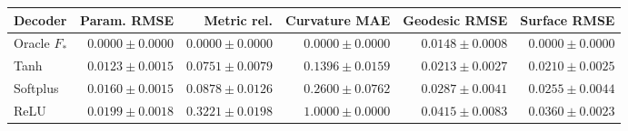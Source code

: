 \begin{tabular}{lrrrrr}
\toprule
Decoder & Param. RMSE & Metric rel. & Curvature MAE & Geodesic RMSE & Surface RMSE \\
\midrule
Oracle $F_*$ & $0.0000\pm0.0000$ & $0.0000\pm0.0000$ & $0.0000\pm0.0000$ & $0.0148\pm0.0008$ & $0.0000\pm0.0000$ \\
Tanh & $0.0123\pm0.0015$ & $0.0751\pm0.0079$ & $0.1396\pm0.0159$ & $0.0213\pm0.0027$ & $0.0210\pm0.0025$ \\
Softplus & $0.0160\pm0.0015$ & $0.0878\pm0.0126$ & $0.2600\pm0.0762$ & $0.0287\pm0.0041$ & $0.0255\pm0.0044$ \\
ReLU & $0.0199\pm0.0018$ & $0.3221\pm0.0198$ & $1.0000\pm0.0000$ & $0.0415\pm0.0083$ & $0.0360\pm0.0023$ \\
\bottomrule
\end{tabular}
